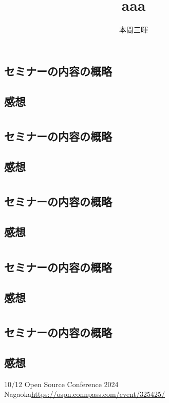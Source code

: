\documentclass[titlepage,a4paper]{jsarticle}
\title{aaa}
\author{本間三暉}
\begin{document}
\maketitle
\section{} %
\subsection{セミナーの内容の概略}

\subsection{感想}

\section{} %
\subsection{セミナーの内容の概略}

\subsection{感想}

\section{} %
\subsection{セミナーの内容の概略}

\subsection{感想}

\section{} %
\subsection{セミナーの内容の概略}

\subsection{感想}

\section{} %
\subsection{セミナーの内容の概略}

\subsection{感想}

\begin{thebibliography}{99}
  \bibitem{} 10/12 Open Source Conference 2024 Nagaoka\url{https://ospn.connpass.com/event/325425/}
\end{thebibliography}
\end{document}
